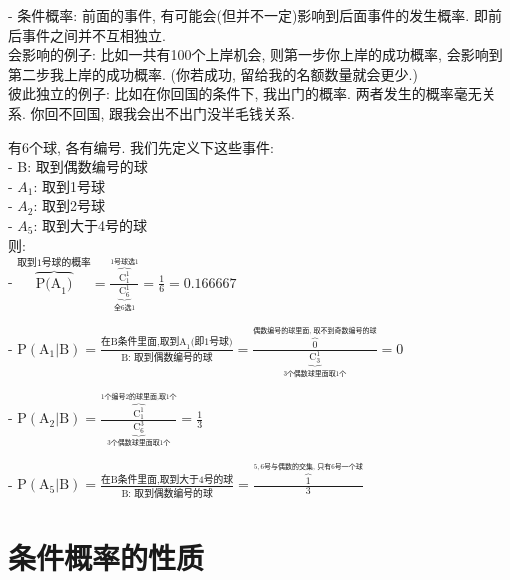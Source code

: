 \documentclass[UTF8]{ctexart}
\begin{document}
	- 条件概率: 前面的事件, 有可能会(但并不一定)影响到后面事件的发生概率. 即前后事件之间并不互相独立.  \\
	会影响的例子: 比如一共有100个上岸机会, 则第一步你上岸的成功概率, 会影响到第二步我上岸的成功概率. (你若成功, 留给我的名额数量就会更少.) \\
	彼此独立的例子: 比如在你回国的条件下, 我出门的概率. 两者发生的概率毫无关系. 你回不回国, 跟我会出不出门没半毛钱关系.
	
	
	
	
	
	
	
	
	
	
	\begin{myEnvSample}
		有6个球, 各有编号.  我们先定义下这些事件: \\
		- B: 取到偶数编号的球 \\
		- $A_1$: 取到1号球 \\
		- $A_2$: 取到2号球 \\
		- $A_5$: 取到大于4号的球 \\
		
		则: \\
		- $
		\overset{\text{取到1号球的概率}}{\overbrace{\text{P(A}_1\text{)}}}=\frac{\overset{1\text{号球选}1}{\overbrace{\text{C}_{1}^{1}}}}{\underset{\text{全6选}1}{\underbrace{\text{C}_{6}^{1}}}}=\frac{1}{6}=0.166667
		$
		
		- $
		\text{P}\left( \text{A}_1|\text{B} \right) =\frac{\text{在B条件里面,取到A}_1\text{(即1号球)}}{\text{B:\ 取到偶数编号的球}}=\frac{\overset{\text{偶数编号的球里面,\ 取不到奇数编号的球}}{\overbrace{0}}}{\underset{3\text{个偶数球里面取1个}}{\underbrace{\text{C}_{3}^{1}}}}=0
		$
		
		- $
		\text{P}\left( \text{A}_2|\text{B} \right) =\frac{\overset{1\text{个编号2的球里面,取1个}}{\overbrace{\text{C}_{1}^{1}}}}{\underset{3\text{个偶数球里面取1个}}{\underbrace{\text{C}_{6}^{3}}}}=\frac{1}{3}
		$
		
		- $
		\text{P}\left( \text{A}_5|\text{B} \right) =\frac{\text{在B条件里面,取到大于4号的球}}{\text{B:\ 取到偶数编号的球}}=\frac{\overset{5,6\text{号与偶数的交集,\ 只有6号一个球}}{\overbrace{1}}}{3}
		$
			
	\end{myEnvSample}
	
	

	
	\section{条件概率的性质}
	
\end{document}
